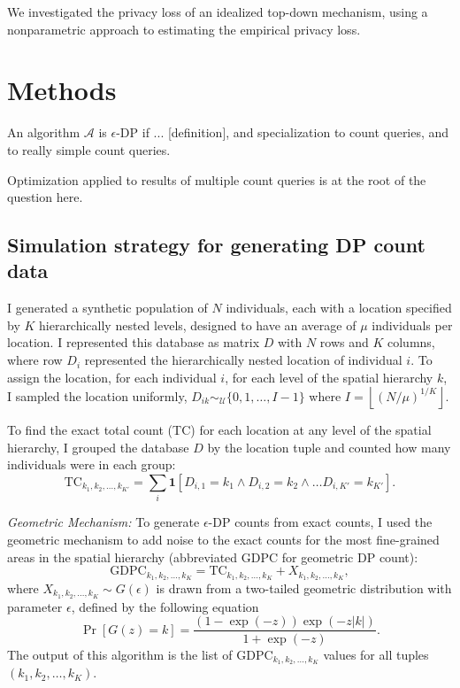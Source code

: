 \documentclass{article}
\begin{document}
We investigated the privacy loss of an idealized top-down mechanism, using a nonparametric approach to estimating the empirical privacy loss.

\section{Methods}
\label{methods}

An algorithm $\mathcal{A}$ is $\epsilon$-DP if ... [definition], and specialization to count queries, and to really simple count queries.

Optimization applied to results of multiple count queries is at the root of the question here.

\subsection{Simulation strategy for generating DP count data}
I generated a synthetic population of $N$ individuals, each with a location specified by $K$ hierarchically nested levels, designed to have an average of $\mu$ individuals per location.
I represented this database as matrix $D$ with $N$ rows and $K$ columns, where row $D_i$ represented the hierarchically nested location of individual $i$.
To assign the location, for each individual $i$, for each level of the spatial hierarchy $k$, I sampled the location uniformly,  $D_{ik} \sim_{\mathcal{U}} \{0, 1, \ldots, I-1\}$ where $I = \left\lfloor \left(N/\mu\right)^{1/K} \right\rfloor$.

To find the exact total count (TC) for each location at any level of the spatial hierarchy, I grouped the database $D$ by the location tuple and counted how many individuals were in each group:
$$
\mathrm{TC}_{k_1, k_2, \ldots, k_{K'}} = \sum_i \mathbf{1}\left[
D_{i,1} = k_1 \wedge 
D_{i,2} = k_2 \wedge 
\ldots
D_{i,K'} = k_{K'}
\right].
$$

\emph{Geometric Mechanism:} To generate $\epsilon$-DP counts from exact counts, I used the geometric mechanism to add noise to the exact counts for the most fine-grained areas in the spatial hierarchy (abbreviated GDPC for geometric DP count):
$$
\mathrm{GDPC}_{k_1, k_2, \ldots, k_{K}} = \mathrm{TC}_{k_1, k_2, \ldots, k_{K}} + X_{k_1, k_2, \ldots, k_{K}},
$$
where $X_{k_1, k_2, \ldots, k_{K}} \sim G(\epsilon)$ is drawn from a two-tailed geometric distribution with parameter $\epsilon$, defined by the following equation
$$\Pr[G(z)=k] = \frac{(1 - \exp(-z))\exp(-z|k|)}{1 + \exp(-z)}.$$
The output of this algorithm is the list of $
\mathrm{GDPC}_{k_1, k_2, \ldots, k_{K}}$ values for all tuples $(k_1, k_2, \ldots, k_{K})$.
\end{document}
